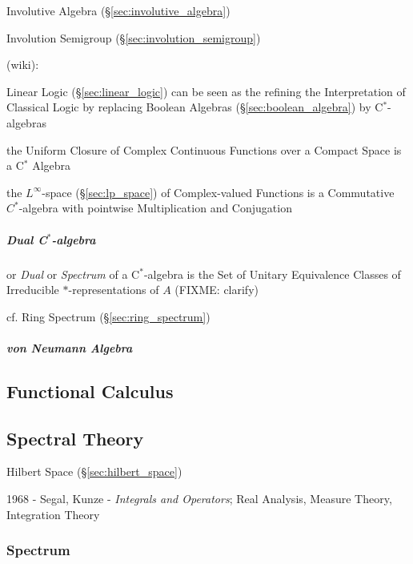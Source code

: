 Involutive Algebra (\S\ref{sec:involutive_algebra})

Involution Semigroup (\S\ref{sec:involution_semigroup})

(wiki):

Linear Logic (\S\ref{sec:linear_logic}) can be seen as the refining
the Interpretation of Classical Logic by replacing Boolean Algebras
(\S\ref{sec:boolean_algebra}) by C$^*$-algebras

the Uniform Closure of Complex Continuous Functions over a Compact Space is a
C$^*$ Algebra

the $L^\infty$-space (\S\ref{sec:lp_space}) of Complex-valued Functions is a
Commutative $C^*$-algebra with pointwise Multiplication and Conjugation



\subparagraph{Dual C$^*$-algebra}\label{sec:cstar_dual}\hfill

or \emph{Dual} or \emph{Spectrum} of a C$^*$-algebra is the Set of Unitary
Equivalence Classes of Irreducible $*$-representations of $A$ (FIXME: clarify)

cf. Ring Spectrum (\S\ref{sec:ring_spectrum})



\subparagraph{von Neumann Algebra}\label{sec:vonneumann_algebra}\hfill



\subsection{Functional Calculus}\label{sec:functional_calculus}

\subsection{Spectral Theory}\label{sec:spectral_theory}

Hilbert Space (\S\ref{sec:hilbert_space})

1968 - Segal, Kunze - \emph{Integrals and Operators}; Real Analysis, Measure
Theory, Integration Theory



\subsubsection{Spectrum}\label{sec:spectrum}

